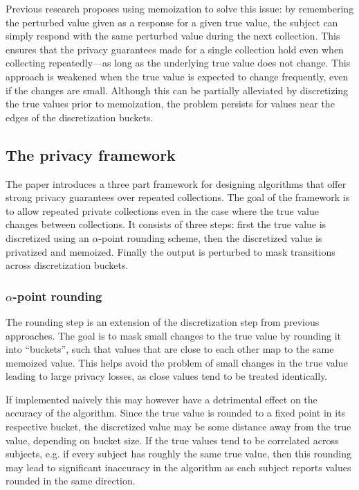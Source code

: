 \documentclass[12pt]{article}
\begin{document}
Previous research \cite{google_rappor} proposes using memoization to solve this issue: by remembering the perturbed value given as a response for a given true value, the subject can simply respond with the same perturbed value during the next collection. This ensures that the privacy guarantees made for a single collection hold even when collecting repeatedly---as long as the underlying true value does not change. This approach is weakened when the true value is expected to change frequently, even if the changes are small. Although this can be partially alleviated by discretizing the true values prior to memoization, the problem persists for values near the edges of the discretization buckets.

\subsection{The privacy framework \label{sec:framework}}

The paper \cite{microsoft_telemetry} introduces a three part framework for designing algorithms that offer strong privacy guarantees over repeated collections. The goal of the framework is to allow repeated private collections even in the case where the true value changes between collections. It consists of three steps: first the true value is discretized using an $\alpha$-point rounding scheme, then the discretized value is privatized and memoized. Finally the output is perturbed to mask transitions across discretization buckets.

\subsubsection{$\alpha$-point rounding \label{sec:alpha_rounding}}

The rounding step is an extension of the discretization step from previous approaches. The goal is to mask small changes to the true value by rounding it into ``buckets'', such that values that are close to each other map to the same memoized value. This helps avoid the problem of small changes in the true value leading to large privacy losses, as close values tend to be treated identically.

If implemented naively this may however have a detrimental effect on the accuracy of the algorithm. Since the true value is rounded to a fixed point in its respective bucket, the discretized value may be some distance away from the true value, depending on bucket size. If the true values tend to be correlated across subjects, e.g. if every subject has roughly the same true value, then this rounding may lead to significant inaccuracy in the algorithm as each subject reports values rounded in the same direction.
\end{document}
